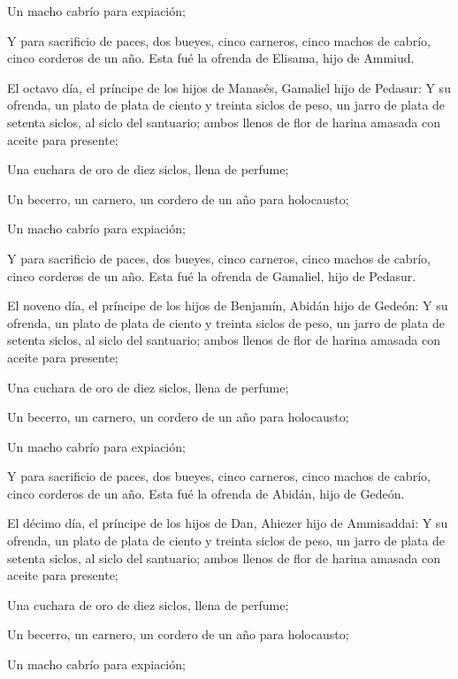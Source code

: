  Un macho cabrío para expiación;

 Y para sacrificio de paces, dos bueyes, cinco carneros,
cinco machos de cabrío, cinco corderos de un año. Esta fué la ofrenda de
Elisama, hijo de Ammiud.

 El octavo día, el príncipe de los hijos de Manasés,
Gamaliel hijo de Pedasur:  Y su ofrenda, un plato de plata
de ciento y treinta siclos de peso, un jarro de plata de setenta siclos,
al siclo del santuario; ambos llenos de flor de harina amasada con
aceite para presente;

 Una cuchara de oro de diez siclos, llena de perfume;

 Un becerro, un carnero, un cordero de un año para
holocausto;

 Un macho cabrío para expiación;

 Y para sacrificio de paces, dos bueyes, cinco carneros,
cinco machos de cabrío, cinco corderos de un año. Esta fué la ofrenda de
Gamaliel, hijo de Pedasur.

 El noveno día, el príncipe de los hijos de Benjamín,
Abidán hijo de Gedeón:  Y su ofrenda, un plato de plata de
ciento y treinta siclos de peso, un jarro de plata de setenta siclos, al
siclo del santuario; ambos llenos de flor de harina amasada con aceite
para presente;

 Una cuchara de oro de diez siclos, llena de perfume;

 Un becerro, un carnero, un cordero de un año para
holocausto;

 Un macho cabrío para expiación;

 Y para sacrificio de paces, dos bueyes, cinco carneros,
cinco machos de cabrío, cinco corderos de un año. Esta fué la ofrenda de
Abidán, hijo de Gedeón.

 El décimo día, el príncipe de los hijos de Dan, Ahiezer
hijo de Ammisaddai:  Y su ofrenda, un plato de plata de
ciento y treinta siclos de peso, un jarro de plata de setenta siclos, al
siclo del santuario; ambos llenos de flor de harina amasada con aceite
para presente;

 Una cuchara de oro de diez siclos, llena de perfume;

 Un becerro, un carnero, un cordero de un año para
holocausto;

 Un macho cabrío para expiación;

